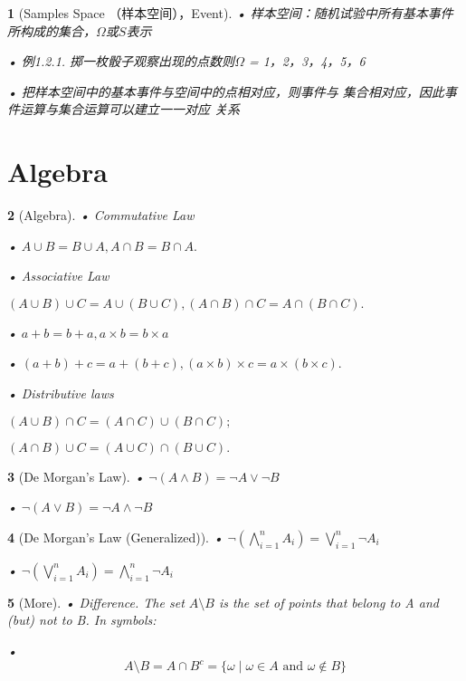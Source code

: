\documentclass[UTF8]{report}
\theoremstyle{MyLineTheoremStyle} %
\theoremstyle{MyBlockTheoremStyle} %
\theoremstyle{MySubsubsectionStyle} %
\newtheorem{definition}{}
\begin{document}
\begin{definition}[Samples Space （样本空间），Event]
    • 样本空间：随机试验中所有基本事件所构成的集合，\(\Omega\)或\(S\)表示 \par
    • 例1.2.1. 掷一枚骰子观察出现的点数则\(\Omega\) = { 1，2，3，4，5，6 } \par
    • 把样本空间中的基本事件与空间中的点相对应，则事件与
集合相对应，因此事件运算与集合运算可以建立一一对应
关系
    \end{definition}

\section{Algebra}
\begin{definition}[Algebra]
    • Commutative Law \par
    • \(A \cup B = B \cup A, A \cap B = B \cap A.\) \par
    • Associative Law\par
    \((A \cup B) \cup C = A \cup (B \cup C), (A \cap B) \cap C = A \cap (B \cap C).\)\par
    • \(a + b = b + a, a \times b = b \times a\)\par
    • \((a + b) + c = a + (b + c), (a \times b) \times c = a \times (b \times c).\)\par
    • Distributive laws \par
    \((A \cup B) \cap C = (A \cap C) \cup (B \cap C);\)\par
    \((A \cap B) \cup C = (A \cup C) \cap (B \cup C).\) \par
\end{definition}

\begin{definition}[De Morgan's Law]
    • \(\neg (A \land B) = \neg A \lor \neg B\) \par
    • \(\neg (A \lor B) = \neg A \land \neg B\) \par
\end{definition}

\begin{definition}[De Morgan's Law (Generalized)]
    • \(\neg \left( \bigwedge_{i=1}^{n} A_i \right) = \bigvee_{i=1}^{n} \neg A_i\) \par
    • \(\neg \left( \bigvee_{i=1}^{n} A_i \right) = \bigwedge_{i=1}^{n} \neg A_i\) \par
\end{definition}

\begin{definition}[More]
    • Difference. The set \(A\setminus B\) is the set of points that belong to A and (but) not to B. In symbols: \par
    • \[
A \setminus B = A \cap B^c = \{ \omega \mid \omega \in A \text{ and } \omega \notin B \}
\] \par
\end{definition}
\end{document}
